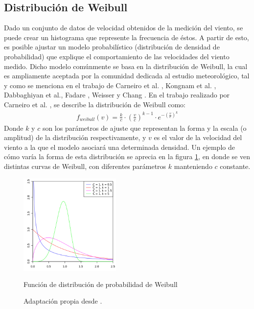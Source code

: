 \subsection{Distribución de Weibull}
Dado un conjunto de datos de velocidad obtenidos de la medición del viento, se puede crear un histograma que represente la frecuencia de éstos. A partir de esto, es posible ajustar un modelo probabilístico (distribución de densidad de probabilidad) que explique el comportamiento de las velocidades del viento medido. Dicho modelo comúnmente se basa en la distribución de Weibull, la cual es ampliamente aceptada por la comunidad dedicada al estudio meteorológico, tal y como se menciona en el trabajo de Carneiro et al. \cite{Carneiro15}, Kongnam et al. \cite{Kongnam15}, Dabbaghiyan et al.\cite{Dabbaghiyan15}, Fadare \cite{Fadare08}, Weisser \cite{Weisser02} y Chang \cite{Chang10_2}. En el trabajo realizado por Carneiro et al. \cite{Carneiro15}, se describe la distribución de Weibull como: 
 \begin{align}\label{eq:weibull}
     f_{weibull}(v) = \frac{k}{c} \cdot (\frac{v}{c})^{k-1} \cdot e^{-(\frac{v}{c})^ k}
 \end{align}
 Donde $k$ y $c$ son los parámetros de ajuste que representan la forma y la escala (o amplitud) de la distribución respectivamente, y $v$ es el valor de la velocidad del viento a la que el modelo asociará una determinada densidad. Un ejemplo de cómo varía la forma de esta distribución se aprecia en la figura \ref{fig:weibull_fig}, en donde se ven distintas curvas de Weibull, con diferentes parámetros $k$ manteniendo $c$ constante.
\begin{figure}[h!]
    \centering    
    \includegraphics[height=50mm]{figures/weibull_distribution.png} 
    \caption{Función de distribución de probabilidad de Weibull}
    \vspace{-.25cm} 
    \caption*{Adaptación propia desde \cite{wikiWeibull}.}
    \label{fig:weibull_fig}
\end{figure}
